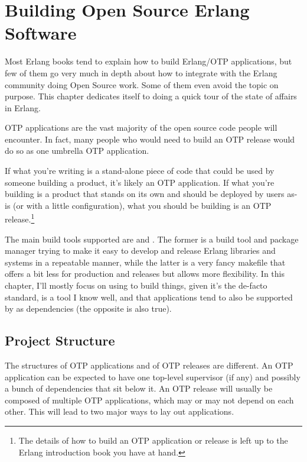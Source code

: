 \chapter{Building Open Source Erlang Software}
\label{chap:building-open-source-erlang-software}

Most Erlang books tend to explain how to build Erlang/OTP applications, but few of them go very much in depth about how to integrate with the Erlang community doing Open Source work. Some of them even avoid the topic on purpose. This chapter dedicates itself to doing a quick tour of the state of affairs in Erlang.

OTP applications are the vast majority of the open source code people will encounter. In fact, many people who would need to build an OTP release would do so as one umbrella OTP application. 

If what you're writing is a stand-alone piece of code that could be used by someone building a product, it's likely an OTP application. If what you're building is a product that stands on its own and should be deployed by users as-is (or with a little configuration), what you should be building is an OTP release.\footnote{The details of how to build an OTP application or release is left up to the Erlang introduction book you have at hand.}

The main build tools supported are  and . The former is a build tool and package manager trying to make it easy to develop and release Erlang libraries and systems in a repeatable manner, while the latter is a very fancy makefile that offers a bit less for production and releases but allows more flexibility. In this chapter, I'll mostly focus on using  to build things, given it's the de-facto standard, is a tool I know well, and that  applications tend to also be supported by  as dependencies (the opposite is also true).

\section{Project Structure}
\label{sec:project-structure}

The structures of OTP applications and of OTP releases are different. An OTP application can be expected to have one top-level supervisor (if any) and possibly a bunch of dependencies that sit below it. An OTP release will usually be composed of multiple OTP applications, which may or may not depend on each other. This will lead to two major ways to lay out applications.

